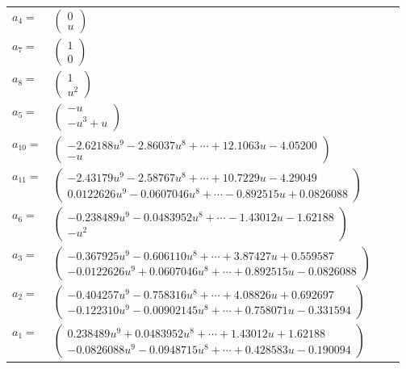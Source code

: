 \documentclass[1p]{elsarticle_modified}
\theoremstyle{definition}
\begin{document}
\begin{tabular}{m{7pt} m{180pt} m{7pt} m{180pt} }
\flushright $a_{4}=$&$\begin{pmatrix}0\\u\end{pmatrix}$ \\
\flushright $a_{7}=$&$\begin{pmatrix}1\\0\end{pmatrix}$ \\
\flushright $a_{8}=$&$\begin{pmatrix}1\\u^2\end{pmatrix}$ \\
\flushright $a_{5}=$&$\begin{pmatrix}- u\\- u^3+u\end{pmatrix}$ \\
\flushright $a_{10}=$&$\begin{pmatrix}-2.62188 u^{9}-2.86037 u^{8}+\cdots+12.1063 u-4.05200\\- u\end{pmatrix}$ \\
\flushright $a_{11}=$&$\begin{pmatrix}-2.43179 u^{9}-2.58767 u^{8}+\cdots+10.7229 u-4.29049\\0.0122626 u^{9}-0.0607046 u^{8}+\cdots-0.892515 u+0.0826088\end{pmatrix}$ \\
\flushright $a_{6}=$&$\begin{pmatrix}-0.238489 u^{9}-0.0483952 u^{8}+\cdots-1.43012 u-1.62188\\- u^2\end{pmatrix}$ \\
\flushright $a_{3}=$&$\begin{pmatrix}-0.367925 u^{9}-0.606110 u^{8}+\cdots+3.87427 u+0.559587\\-0.0122626 u^{9}+0.0607046 u^{8}+\cdots+0.892515 u-0.0826088\end{pmatrix}$ \\
\flushright $a_{2}=$&$\begin{pmatrix}-0.404257 u^{9}-0.758316 u^{8}+\cdots+4.08826 u+0.692697\\-0.122310 u^{9}-0.00902145 u^{8}+\cdots+0.758071 u-0.331594\end{pmatrix}$ \\
\flushright $a_{1}=$&$\begin{pmatrix}0.238489 u^{9}+0.0483952 u^{8}+\cdots+1.43012 u+1.62188\\-0.0826088 u^{9}-0.0948715 u^{8}+\cdots+0.428583 u-0.190094\end{pmatrix}$ \\

\end{tabular}
\end{document}

